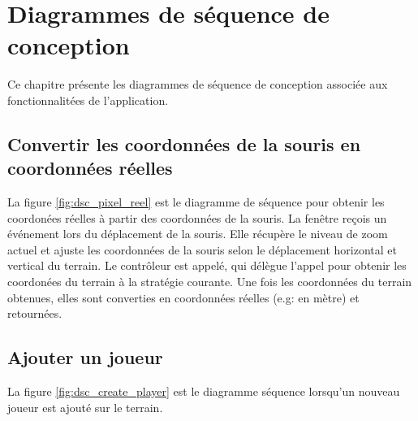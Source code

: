 
\chapter{Diagrammes de séquence de conception}
\label{s:sequence_conception}

Ce chapitre présente les diagrammes de séquence de conception associée aux fonctionnalitées de l'application.

\section{Convertir les coordonnées de la souris en coordonnées réelles}
\label{sec:convertir_coordonnees_souris}


La figure \ref{fig:dsc_pixel_reel} est le diagramme de séquence pour obtenir les coordonées réelles à partir des coordonnées de la souris.
La fenêtre reçois un événement lors du déplacement de la souris.
Elle récupère le niveau de zoom actuel et ajuste les coordonnées de la souris selon le déplacement horizontal et vertical du terrain.
Le contrôleur est appelé, qui délègue l'appel pour obtenir les coordonées du terrain à la stratégie courante.
Une fois les coordonnées du terrain obtenues, elles sont converties en coordonnées réelles (e.g: en mètre) et retournées.


\section{Ajouter un joueur}
\label{sec:ajouter_joueur}


La figure \ref{fig:dsc_create_player} est le diagramme séquence lorsqu'un nouveau joueur est ajouté sur le terrain.

